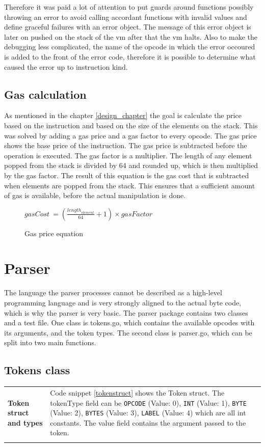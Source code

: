 Therefore it was paid a lot of attention to put guards around functions possibly throwing an error to avoid calling accordant functions with invalid values and define graceful failures with an error object. The message of this error object is later on pushed on the stack of the vm after that the vm halts. Also to make the debugging less complicated, the name of the opcode in which the error occoured is added to the front of the error code, therefore it is possible to determine what caused the error up to instruction kind.

\subsection{Gas calculation}
As mentioned in the chapter \ref{design_chapter} the goal is calculate the price based on the instruction and based on the size of the elements on the stack. This was solved by adding a gas price and a gas factor to every opcode. The gas price shows the base price of the instruction. The gas price is subtracted before the operation is executed. The gas factor is a multiplier. The length of any element popped from the stack is divided by 64 and rounded up, which is then multiplied by the gas factor. The result of this equation is the gas cost that is subtracted when elements are popped from the stack. This ensures that a sufficient amount of gas is available, before the actual manipulation is done. 

\begin{figure}[thp]%
    	\centering
		$
		gasCost\ = \left( \frac { { length }_{ element } }{ 64 } +{ 1 } \right) \times gasFactor
		$
		\caption{Gas price equation}
		\label{gas_factor_calc}
\end{figure}

\section{Parser}
The language the parser processes cannot be described as a high-level programming language and is very strongly aligned to the actual byte code, which is why the parser is very basic. The parser package contains two classes and a test file. One class is tokens.go, which contains the available opcodes with its arguments, and the token types. The second class is parser.go, which can be split into two main functions. 

\subsection{Tokens class}
\begin{tabular}[t]{ p{3cm} p{12.5cm}}
\raggedright
\textbf{Token struct and types} &
Code snippet \ref{tokenstruct} shows the Token struct. The tokenType field can be \texttt{OPCODE} (Value: 0), \texttt{INT} (Value: 1), \texttt{BYTE} (Value: 2), \texttt{BYTES} (Value: 3), \texttt{LABEL} (Value: 4) which are all int constants. The value field contains the argument passed to the token. \\ \\
\end{tabular}

